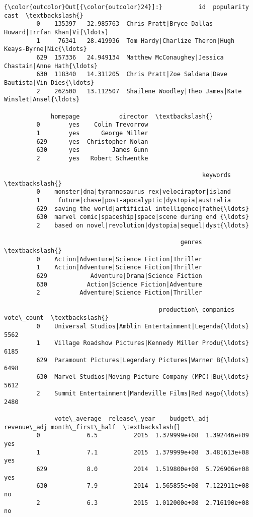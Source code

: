 \documentclass[11pt]{article}
\begin{document}
\begin{Verbatim}[commandchars=\\\{\}]
{\color{outcolor}Out[{\color{outcolor}24}]:}          id  popularity                                               cast  \textbackslash{}
         0    135397   32.985763  Chris Pratt|Bryce Dallas Howard|Irrfan Khan|Vi{\ldots}   
         1     76341   28.419936  Tom Hardy|Charlize Theron|Hugh Keays-Byrne|Nic{\ldots}   
         629  157336   24.949134  Matthew McConaughey|Jessica Chastain|Anne Hath{\ldots}   
         630  118340   14.311205  Chris Pratt|Zoe Saldana|Dave Bautista|Vin Dies{\ldots}   
         2    262500   13.112507  Shailene Woodley|Theo James|Kate Winslet|Ansel{\ldots}   
         
             homepage           director  \textbackslash{}
         0        yes    Colin Trevorrow   
         1        yes      George Miller   
         629      yes  Christopher Nolan   
         630      yes         James Gunn   
         2        yes   Robert Schwentke   
         
                                                       keywords  \textbackslash{}
         0    monster|dna|tyrannosaurus rex|velociraptor|island   
         1     future|chase|post-apocalyptic|dystopia|australia   
         629  saving the world|artificial intelligence|fathe{\ldots}   
         630  marvel comic|spaceship|space|scene during end {\ldots}   
         2    based on novel|revolution|dystopia|sequel|dyst{\ldots}   
         
                                                 genres  \textbackslash{}
         0    Action|Adventure|Science Fiction|Thriller   
         1    Action|Adventure|Science Fiction|Thriller   
         629            Adventure|Drama|Science Fiction   
         630           Action|Science Fiction|Adventure   
         2           Adventure|Science Fiction|Thriller   
         
                                           production\_companies  vote\_count  \textbackslash{}
         0    Universal Studios|Amblin Entertainment|Legenda{\ldots}        5562   
         1    Village Roadshow Pictures|Kennedy Miller Produ{\ldots}        6185   
         629  Paramount Pictures|Legendary Pictures|Warner B{\ldots}        6498   
         630  Marvel Studios|Moving Picture Company (MPC)|Bu{\ldots}        5612   
         2    Summit Entertainment|Mandeville Films|Red Wago{\ldots}        2480   
         
              vote\_average  release\_year    budget\_adj   revenue\_adj month\_first\_half  \textbackslash{}
         0             6.5          2015  1.379999e+08  1.392446e+09              yes   
         1             7.1          2015  1.379999e+08  3.481613e+08              yes   
         629           8.0          2014  1.519800e+08  5.726906e+08              yes   
         630           7.9          2014  1.565855e+08  7.122911e+08               no   
         2             6.3          2015  1.012000e+08  2.716190e+08               no   
         

\end{Verbatim}
\end{document}
